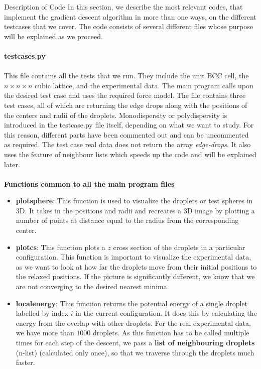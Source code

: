 \documentclass[12pt]{article}
\begin{document}
\newpage
\begin{section}{Description of Code}
In this section, we describe the most relevant codes, that implement the gradient descent algorithm in more than one ways, on the different testcases that we cover. The code consists of several different files whose purpose will be explained as we proceed.\\\\
\textbf{testcases.py}\\\\
This file contains all the tests that we run. They include the unit BCC cell, the $n\times n\times n$ cubic lattice, and the experimental data. The main program calls upon the desired test case and uses the required force model. The file contains three test cases, all of which are returning the edge drops along with the positions of the centers and radii of the droplets. Monodispersity or polydispersity is introduced in the testcase.py file itself, depending on what we want to study. For this reason, different parts have been commented out and can be uncommented as required. The test case real data does not return the array \textit{edge-drops}. It also uses the feature of neighbour lists which speeds up the code and will be explained later.\\\\
\textbf{Functions common to all the main program files}
\begin{itemize}
    \item \textbf{plotsphere}: This function is used to visualize the droplets or test spheres in 3D. It takes in the positions and radii and recreates a 3D image by plotting  a number of points at distance equal to the radius from the corresponding center.
    \item \textbf{plotcs}: This function plots a $z$ cross section of the droplets in a particular configuration. This function is important to visualize the experimental data, as we want to look at how far the droplets move from their initial positions to the relaxed positions. If the picture is significantly different, we know that we are not converging to the desired nearest minima. 
    \item \textbf{localenergy}: This function returns the potential energy of a single droplet labelled by index $i$ in the current configuration. It does this by calculating the energy from the overlap with other droplets. For the real experimental data, we have more than $1000$ droplets. As this function has to be called multiple times for each step of the descent, we pass a \textbf{list of neighbouring droplets} (n-list) (calculated only once), so that we traverse through the droplets much faster. 

\end{itemize}
\end{section}
\end{document}
